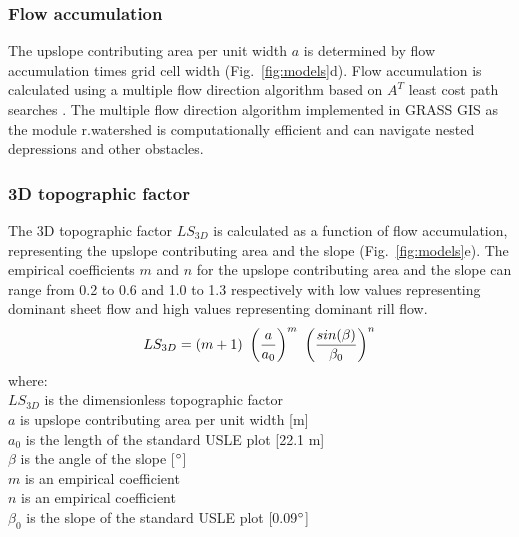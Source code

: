 \documentclass[gmd, manuscript]{copernicus}
\begin{document}

\subsubsection{Flow accumulation}
%
The upslope contributing area per unit width $a$
is determined by flow accumulation times grid cell width
(Fig.~\ref{fig:models}d). 
Flow accumulation is calculated using 
a multiple flow direction algorithm \citep{Metz2009} 
based on $A^{T}$ least cost path searches \citep{Ehlschlaeger1989}. 
The multiple flow direction algorithm 
implemented in GRASS GIS as the module r.watershed
is computationally efficient and can
navigate nested depressions and other obstacles. 


\subsubsection{3D topographic factor}
%
The 3D topographic factor $LS_{3D}$
is calculated as a function of flow accumulation,
representing the upslope contributing area
and the slope 
(Fig.~\ref{fig:models}e). 
%
The empirical coefficients $m$ and $n$
for the upslope contributing area 
and the slope
can range from 0.2 to 0.6
and 1.0 to 1.3 respectively
with low values representing dominant sheet flow
and high values representing dominant rill flow.
%
\begin{equation}
\label{eq:ls_factor}
LS_{3D} = (m+1) ~ \left({a \over a_0}\right)^m ~ \left({sin(\beta) \over \beta_0}\right)^n
\end{equation}
%
{\small
\noindent
where: \\
\noindent
\hspace*{0.5em} $LS_{3D}$ is the dimensionless topographic factor\\
\hspace*{0.5em} $a$ is upslope contributing area per unit width [\unit{m}]\\
\hspace*{0.5em} $a_0$ is the length of the standard USLE plot [22.1 \unit{m}]\\
\hspace*{0.5em} $\beta$ is the angle of the slope [$^{\circ}$]\\
\hspace*{0.5em} $m$ is an empirical coefficient\\
\hspace*{0.5em} $n$ is an empirical coefficient\\
\hspace*{0.5em} $\beta_0$ is the slope of the standard USLE plot [0.09$^{\circ}$]\\
}
\end{document}
